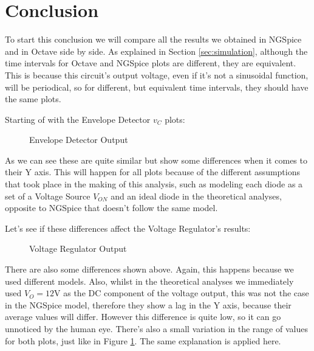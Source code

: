 \section{Conclusion}
\label{sec:conclusion}

To start this conclusion we will compare all the results we obtained in NGSpice and in Octave side by side. As explained in Section \ref{sec:simulation}, although the time intervals for Octave and NGSpice plots are different, they are equivalent. This is because this circuit's output voltage, even if it's not a sinusoidal function, will be periodical, so for different, but equivalent time intervals, they should have the same plots.


Starting of with the Envelope Detector $v_C$ plots:

\FloatBarrier
\begin{figure}
	\centering
	\qquad
	\caption{Envelope Detector Output}
	\label{fig:conc2}
\end{figure}
\FloatBarrier

As we can see these are quite similar but show some differences when it comes to their Y axis. This will happen for all plots because of the different assumptions that took place in the making of this analysis, such as modeling each diode as a set of a Voltage Source $V_{ON}$ and an ideal diode in the theoretical analyses, opposite to NGSpice that doesn't follow the same model.

Let's see if these differences affect the Voltage Regulator's results:
\FloatBarrier
\begin{figure}
	\centering
	\qquad
	\caption{Voltage Regulator Output}
	\label{fig:conc3}
\end{figure}
\FloatBarrier

There are also some differences shown above. Again, this happens because we used different models. Also, whilst in the theoretical analyses we immediately used $V_O=12$V as the DC component of the voltage output, this was not the case in the NGSpice model, therefore they show a lag in the Y axis, because their average values will differ. However this difference is quite low, so it can go unnoticed by the human eye. There's also a small variation in the range of values for both plots, just like in Figure \ref{fig:conc2}. The same explanation is applied here.~

